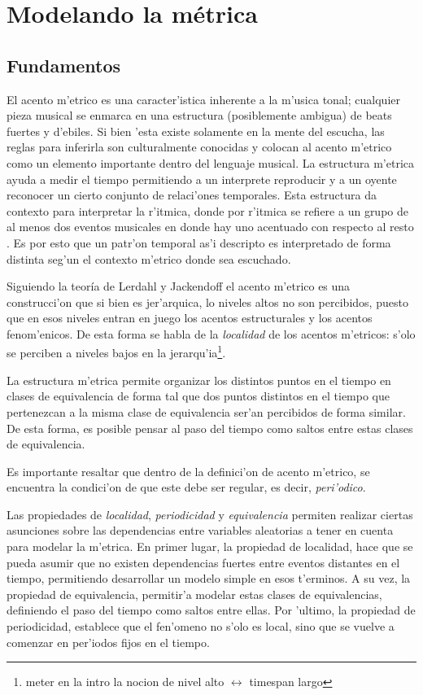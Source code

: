 \section{Modelando la m\'etrica}
\label{sec:metric_model}
\subsection{Fundamentos}
El acento m'etrico es una caracter'istica inherente a la m'usica tonal; cualquier pieza musical se enmarca en una estructura 
(posiblemente ambigua) de beats fuertes y d'ebiles. Si bien 'esta existe solamente en la mente del escucha, las reglas para inferirla son culturalmente conocidas 
y colocan al acento m'etrico como un elemento importante dentro del lenguaje musical. La estructura m'etrica ayuda a medir el tiempo permitiendo a un interprete 
reproducir y a un oyente reconocer un cierto conjunto de relaci'ones temporales. Esta estructura da contexto para interpretar la r'itmica,  
donde por r'itmica se refiere a un grupo de al menos dos eventos musicales en donde hay uno acentuado con respecto al resto \cite{CooperMeyer60}.
Es por esto que un patr'on temporal as'i descripto es interpretado de forma distinta seg'un el contexto m'etrico donde sea escuchado. 

Siguiendo la teor\'ia de Lerdahl y Jackendoff el acento m'etrico es una construcci'on que si bien es jer'arquica, lo niveles altos no son percibidos, puesto
que en esos niveles entran en juego los acentos estructurales y los acentos fenom'enicos. De esta forma se habla de la \emph{localidad} de los acentos m'etricos: 
s'olo se perciben a niveles bajos en la jerarqu'ia\footnote{meter en la intro la nocion de nivel alto $\leftrightarrow$ timespan largo}. 

La estructura m'etrica permite organizar los distintos puntos en el tiempo en clases de 
equivalencia de forma tal que dos puntos distintos en el tiempo que pertenezcan a la misma clase de equivalencia ser'an percibidos de forma similar\cite{Benjamin84}. 
De esta forma, es posible pensar al paso del tiempo como saltos entre estas clases de equivalencia.

Es importante resaltar que dentro de la definici'on de acento m'etrico, se encuentra la condici'on de que este debe ser regular, es decir, \emph{peri'odico}. 

Las propiedades de \emph{localidad}, \emph{periodicidad} y \emph{equivalencia} permiten realizar ciertas asunciones sobre las dependencias entre variables aleatorias 
a tener en cuenta para modelar la m'etrica. En primer lugar, la propiedad de localidad, hace que se pueda asumir que no existen dependencias fuertes entre eventos distantes 
en el tiempo, permitiendo desarrollar un modelo simple en esos t'erminos.  A su vez, la propiedad de equivalencia, permitir'a modelar estas clases de equivalencias, 
definiendo el paso del tiempo como saltos entre ellas. Por 'ultimo, la propiedad de periodicidad, establece que el fen'omeno no s'olo es local, 
sino que se vuelve a comenzar en per'iodos fijos en el tiempo.


